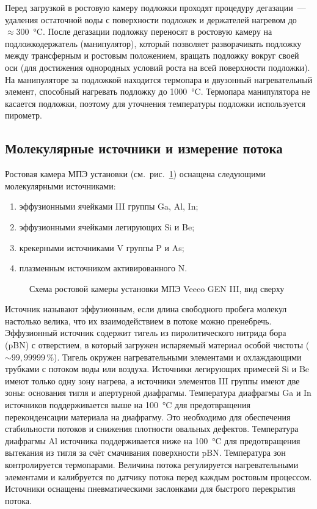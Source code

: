 Перед загрузкой в ростовую камеру подложки проходят процедуру дегазации~--- удаления остаточной воды с поверхности подложек и держателей нагревом до \(\approx 300\)~\si{\degreeCelsius}. После дегазации подложку переносят в ростовую камеру на подложкодержатель (манипулятор), который позволяет разворачивать подложку между трансферным и ростовым положением, вращать подложку вокруг своей оси (для достижения однородных условий роста на всей поверхности подложки). На манипуляторе за подложкой находится термопара и двузонный нагревательный элемент, способный нагревать подложку до 1000~\si{\degreeCelsius}. Термопара манипулятора не касается подложки, поэтому для уточнения температуры подложки используется пирометр.

\subsection{Молекулярные источники и измерение потока}\label{sec:ch2/sec1/sub1}

Ростовая камера МПЭ установки (см.~рис.~\cref{fig:Image_11}) оснащена следующими молекулярными источниками:

\begin{enumerate}[beginpenalty=10000]
	\item эффузионными ячейками III группы Ga, Al, In;
	\item эффузионными ячейками легирующих Si и Be;
	\item крекерными источниками V группы P и As;
	\item плазменным источником активированного N.
\end{enumerate}

\begin{figure}[ht]
	\caption{Схема ростовой камеры установки МПЭ Veeco GEN III, вид сверху}\label{fig:Image_11}
\end{figure}

Источник называют эффузионным, если длина свободного пробега молекул настолько велика, что их взаимодействием в потоке можно пренебречь. Эффузионный источник содержит тигель из пиролитического нитрида бора (pBN) с отверстием, в который загружен испаряемый материал особой чистоты (\(\sim 99,99999\,\%\)). Тигель окружен нагревательными элементами и охлаждающими трубками с потоком воды или воздуха. Источники легирующих примесей Si и Be имеют только одну зону нагрева, а источники элементов III группы имеют две зоны: основания тигля и апертурной диафрагмы. Температура диафрагмы Ga и In источников поддерживается выше на 100~\si{\degreeCelsius} для предотвращения переконденсации материала на диафрагму. Это необходимо для обеспечения стабильности потоков и снижения плотности овальных дефектов. Температура диафрагмы Al источника поддерживается ниже на 100~\si{\degreeCelsius} для предотвращения вытекания из тигля за счёт смачивания поверхности pBN. Температура зон контролируется термопарами. Величина потока регулируется нагревательными элементами и калибруется по датчику потока перед каждым ростовым процессом. Источники оснащены пневматическими заслонками для быстрого перекрытия потока.

